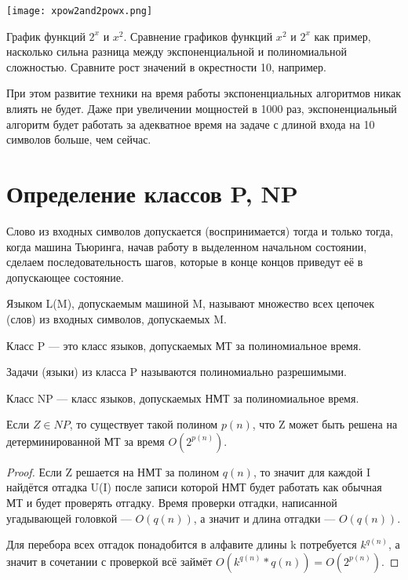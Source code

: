 \begin{marginfigure}[-6.5cm]
	\texttt{[image: xpow2and2powx.png]}
	\caption{График функций $2^x$ и $x^2$.
	Сравнение графиков функций $x^2$ и  $2^x$ как пример,
насколько сильна разница между экспоненциальной и полиномиальной
сложностью. Сравните рост значений в
окрестности 10, например.
}
\end{marginfigure}

При этом развитие техники на время работы экспоненциальных алгоритмов никак
влиять не будет. Даже при увеличении мощностей в 1000 раз, экспоненциальный
алгоритм будет работать за адекватное время на задаче с длиной входа на 10
символов больше, чем сейчас.


\section{Определение классов P, NP}

\begin{definition}
	Слово из входных символов допускается (воспринимается) тогда и только
	тогда, когда машина Тьюринга, начав работу в выделенном начальном
	состоянии, сделаем последовательность шагов, которые в конце концов
	приведут её в допускающее состояние.
\end{definition}
\begin{definition}
	Языком L(M), допускаемым машиной M, называют множество всех цепочек
	(слов) из входных символов, допускаемых M.
\end{definition}

\begin{definition}
	Класс P --- это класс языков, допускаемых МТ за полиномиальное
	время. 
\end{definition}
Задачи (языки) из класса P называются полиномиально разрешимыми.
\begin{definition}
	Класс NP --- класс языков, допускаемых НМТ за полиномиальное время.
\end{definition}

\begin{theorem}
	Если $Z\in NP$, то существует такой полином  $p(n)$, что Z может быть
	решена на детерминированной МТ за время  $O(2^{p(n)})$.
\end{theorem}
\begin{proof}
Если Z решается на НМТ за полином $q\left( n \right) $, то значит для каждой I
найдётся отгадка U(I) после записи которой НМТ будет работать как обычная МТ и
будет проверять отгадку. Время проверки отгадки, написанной
угадывающей головкой --- $O(q(n))$, а значит и длина отгадки --- $O(q(n))$. 

Для перебора всех отгадок понадобится в алфавите длины k потребуется $k^{q(n)}$,
а значит в сочетании с
проверкой всё займёт $O(k^{q(n)}*q(n)) = O(2^{p(n)})$.
\end{proof}

